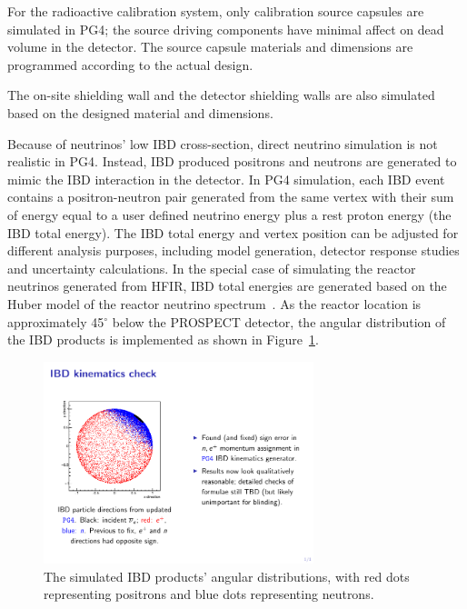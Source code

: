 For the radioactive calibration system, only calibration source capsules are simulated in PG4; the source driving components have minimal affect on dead volume in the detector. 
The source capsule materials and dimensions are programmed according to the actual design.

The on-site shielding wall and the detector shielding walls are also simulated based on the designed material and dimensions.


Because of neutrinos' low IBD cross-section, direct neutrino simulation is not realistic in PG4. 
Instead, IBD produced positrons and neutrons are generated to mimic the IBD interaction in the detector. 
In PG4 simulation, each IBD event contains a positron-neutron pair generated from the same vertex with their sum of energy equal to a user defined neutrino energy plus a rest proton energy (the IBD total energy).
The IBD total energy and vertex position can be adjusted for different analysis purposes, including model generation, detector response studies and uncertainty calculations.
In the special case of simulating the reactor neutrinos generated from HFIR, IBD total energies are generated based on the Huber model of the reactor neutrino spectrum~\cite{bib:huber}.
As the reactor location is approximately 45$^\circ$ below the PROSPECT detector, the angular distribution of the IBD products is implemented as shown in Figure~\ref{fig:IBDangle}.

\begin{figure}[h!]
    \centering
    \includegraphics[width=0.7\textwidth]{Figures/IBDKinematics.pdf}
	\caption[The simulated IBD products angular distribution]{
    The simulated IBD products' angular distributions, with red dots representing positrons and blue dots representing neutrons.}
    \label{fig:IBDangle}
\end{figure}

